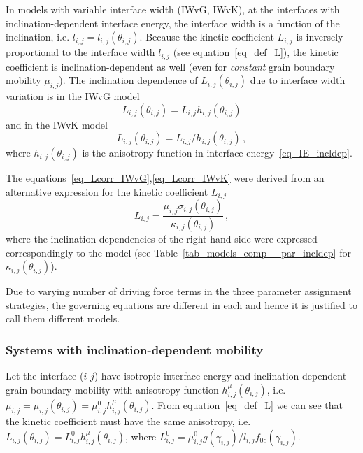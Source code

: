 In models with variable interface width (IWvG, IWvK), at the interfaces with inclination-dependent interface energy, the interface width is a function of the inclination, i.e. $l_{i,j}=l_{i,j}(\theta_{i,j})$. Because the kinetic coefficient $L_{i,j}$ is inversely proportional to the interface width $l_{i,j}$ (see equation~\eqref{eq_def_L}), the kinetic coefficient is inclination-dependent as well (even for \textit{constant} grain boundary mobility $\mu_{i,j}$). The inclination dependence of $L_{i,j}(\theta_{i,j})$ due to interface width variation is in the IWvG model
\begin{equation}\label{eq_Lcorr_IWvG}
	L_{i,j}(\theta_{i,j}) = L_{i,j}h_{i,j}(\theta_{i,j})
\end{equation}
and in the IWvK model
\begin{equation}\label{eq_Lcorr_IWvK}
	L_{i,j}(\theta_{i,j}) = L_{i,j}/h_{i,j}(\theta_{i,j}) \,,
\end{equation}
where $h_{i,j}(\theta_{i,j})$ is the anisotropy function in interface energy~\eqref{eq_IE_incldep}.%

The equations~\eqref{eq_Lcorr_IWvG},\eqref{eq_Lcorr_IWvK} were derived from an alternative expression for the kinetic coefficient $L_{i,j}$
\begin{equation}
	L_{i,j} = \frac{\mu_{i,j}\sigma_{i,j}(\theta_{i,j})}{\kappa_{i,j}(\theta_{i,j})} \,,
\end{equation}
where the inclination dependencies of the right-hand side were expressed correspondingly to the model (see Table~\ref{tab_models_comp__par_incldep} for $\kappa_{i,j}(\theta_{i,j})$).

Due to varying number of driving force terms in the three parameter assignment strategies, the governing equations are different in each and hence it is justified to call them different models.

\subsubsection{Systems with inclination-dependent mobility}
Let the interface ($i$-$j$) have isotropic interface energy and inclination-dependent grain boundary mobility with anisotropy function $h_{i,j}^\mu(\theta_{i,j})$, i.e. $\mu_{i,j}=\mu_{i,j}(\theta_{i,j})=\mu_{i,j}^0h_{i,j}^\mu(\theta_{i,j})$. From equation~\eqref{eq_def_L} we can see that the kinetic coefficient must have the same anisotropy, i.e. $L_{i,j}(\theta_{i,j})=L_{i,j}^0h_{i,j}^\mu(\theta_{i,j})$, where $L_{i,j}^0=\mu_{i,j}^0g(\gamma_{i,j})/l_{i,j}f_{0c}(\gamma_{i,j})$. 


